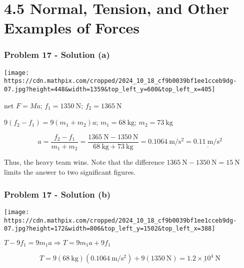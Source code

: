 \documentclass{beamer}
\begin{document}
\section{4.5 Normal, Tension, and Other Examples of Forces}

\begin{frame}
\frametitle{Problem 17 - Solution (a)}
\texttt{[image: https://cdn.mathpix.com/cropped/2024\_10\_18\_cf9b0039bf1ee1cceb9dg-07.jpg?height=448\&width=1359\&top\_left\_y=600\&top\_left\_x=405]}

net $F = Ma$; $f_1 = 1350 \mathrm{~N}$; $f_2 = 1365 \mathrm{~N}$

$9(f_2 - f_1) = 9(m_1 + m_2)a$; $m_1 = 68 \mathrm{~kg}$; $m_2 = 73 \mathrm{~kg}$

\begin{equation*}
a = \frac{f_2 - f_1}{m_1 + m_2} = \frac{1365 \mathrm{~N} - 1350 \mathrm{~N}}{68 \mathrm{~kg} + 73 \mathrm{~kg}} = 0.1064 \mathrm{~m} / \mathrm{s}^{2} = \underline{0.11 \mathrm{~m} / \mathrm{s}^{2}}
\end{equation*}

Thus, the heavy team wins. Note that the difference $1365 \mathrm{~N} - 1350 \mathrm{~N} = 15 \mathrm{~N}$ limits the answer to two significant figures.
\end{frame}

\begin{frame}
\frametitle{Problem 17 - Solution (b)}
\texttt{[image: https://cdn.mathpix.com/cropped/2024\_10\_18\_cf9b0039bf1ee1cceb9dg-07.jpg?height=172\&width=806\&top\_left\_y=1502\&top\_left\_x=388]}

$T - 9f_1 = 9m_1a \Rightarrow T = 9m_1a + 9f_1$

\begin{equation*}
T = 9(68 \mathrm{~kg})(0.1064 \mathrm{~m} / \mathrm{s}^{2}) + 9(1350 \mathrm{~N}) = \underline{1.2 \times 10^{4} \mathrm{~N}}
\end{equation*}
\end{frame}
\end{document}
